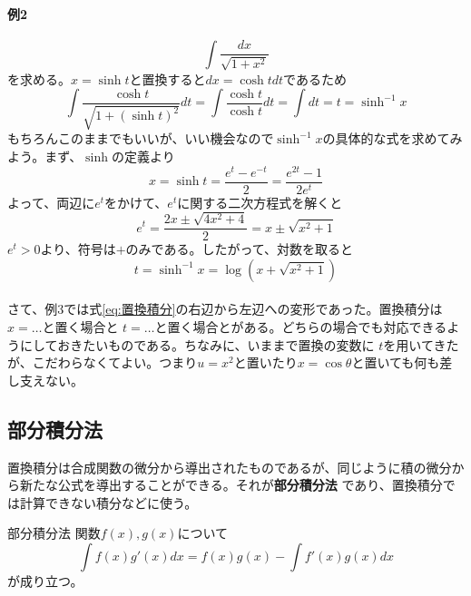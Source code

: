 \documentclass[a4j,dvipdfmx]{jsarticle}
\begin{document}
                \paragraph{例2}
                \begin{equation*}
                    \int \frac{dx}{\sqrt{1+x^2}}
                \end{equation*}
                を求める。$x=\sinh t$と置換すると$dx = \cosh t dt$であるため
                \begin{equation*}
                    \int \frac{\cosh t}{\sqrt{1+(\sinh t)^2}}dt=\int \frac{\cosh t}{\cosh t}dt=\int dt = t = \sinh^{-1} x
                \end{equation*}
                もちろんこのままでもいいが、いい機会なので$\sinh^{-1}x$の具体的な式を求めてみよう。まず、$\sinh$の定義より
                \begin{equation*}
                    x = \sinh t = \frac{e^t-e^{-t}}{2}=\frac{e^{2t}-1}{2e^t}
                \end{equation*}
                よって、両辺に$e^t$をかけて、$e^t$に関する二次方程式を解くと
                \begin{equation*}
                    e^{t} = \frac{2x\pm \sqrt{4x^2+4}}{2}=x\pm\sqrt{x^2+1}
                \end{equation*}
                $e^t>0$より、符号は$+$のみである。したがって、対数を取ると
                \begin{equation}
                    t=\sinh^{-1}x=\log\left(x+\sqrt{x^2+1}\right)\label{eq:arcsinh}
                \end{equation}\\

                さて、例3では式\eqref{eq:置換積分}の右辺から左辺への変形であった。置換積分は$x=\dots$と置く場合と
                $t=\dots$と置く場合とがある。どちらの場合でも対応できるようにしておきたいものである。ちなみに、いままで置換の変数に
                $t$を用いてきたが、こだわらなくてよい。つまり$u=x^2$と置いたり$x=\cos\theta$と置いても何も差し支えない。
            \clearpage
            \subsection{部分積分法}
                置換積分は合成関数の微分から導出されたものであるが、同じように積の微分から新たな公式を導出することができる。それが\textbf{部分積分法}
                であり、置換積分では計算できない積分などに使う。
                \begin{itembox}{部分積分法}
                    関数$f(x),g(x)$について
                    \begin{equation}
                        \int f(x)g'(x) dx = f(x)g(x) - \int f'(x)g(x)dx \label{eq:部分積分法}
                    \end{equation}
                    が成り立つ。
                \end{itembox}
\end{document}
